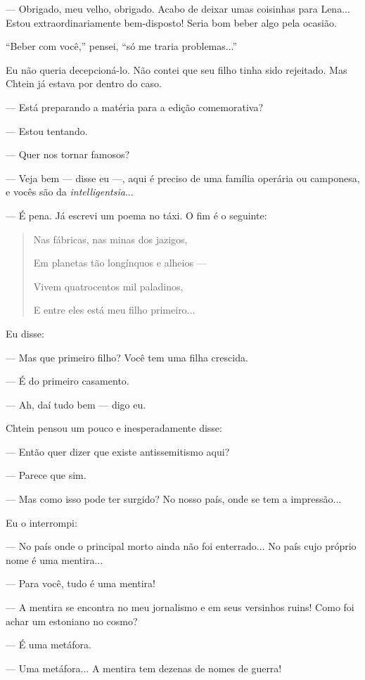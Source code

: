 --- Obrigado, meu velho, obrigado. Acabo de deixar umas coisinhas para
Lena... Estou extraordinariamente bem-disposto! Seria bom beber algo
pela ocasião.

``Beber com você,'' pensei, ``só me traria problemas...''

Eu não queria decepcioná-lo. Não contei que seu filho tinha sido
rejeitado. Mas Chtein já estava por dentro do caso.

--- Está preparando a matéria para a edição comemorativa?

--- Estou tentando.

--- Quer nos tornar famosos?

--- Veja bem --- disse eu ---, aqui é preciso de uma família operária ou
camponesa, e vocês são da \emph{intelligentsia}...

--- É pena. Já escrevi um poema no táxi. O fim é o seguinte:

\begin{quote}
Nas fábricas, nas minas dos jazigos,

Em planetas tão longínquos e alheios ---

Vivem quatrocentos mil paladinos,

E entre eles está meu filho primeiro...
\end{quote}

Eu disse:

--- Mas que primeiro filho? Você tem uma filha crescida.

--- É do primeiro casamento.

--- Ah, daí tudo bem --- digo eu.

Chtein pensou um pouco e inesperadamente disse:

--- Então quer dizer que existe antissemitismo aqui?

--- Parece que sim.

--- Mas como isso pode ter surgido? No nosso país, onde se tem a
impressão...

Eu o interrompi:

--- No país onde o principal morto ainda não foi enterrado... No país
cujo próprio nome é uma mentira...

--- Para você, tudo é uma mentira!

--- A mentira se encontra no meu jornalismo e em seus versinhos ruins!
Como foi achar um estoniano no cosmo?

--- É uma metáfora.

--- Uma metáfora... A mentira tem dezenas de nomes de guerra!

